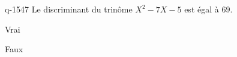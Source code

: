 \begin{truefalse}{q-1547}
Le discriminant du trinôme $X^2-7X-5$ est égal à $69$.
\item* Vrai
\item Faux
\end{truefalse}

